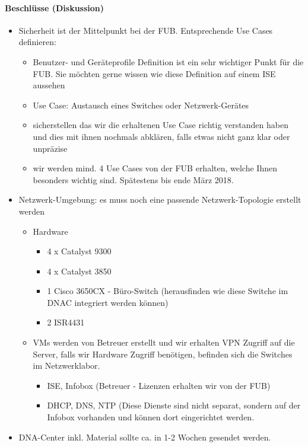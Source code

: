 \paragraph{Beschlüsse (Diskussion)}
\begin{itemize}	
	\item Sicherheit ist der Mittelpunkt bei der FUB. Entsprechende Use Cases definieren:
	\begin{itemize}
		\item Benutzer- und Geräteprofile Definition ist ein sehr wichtiger Punkt für die FUB. Sie möchten gerne wissen wie diese Definition auf einem ISE aussehen 
		\item Use Case: Austausch eines Switches oder Netzwerk-Gerätes
		\item sicherstellen das wir die erhaltenen Use Case richtig verstanden haben und dies mit ihnen nochmals abklären, falls etwas nicht ganz klar oder unpräzise
		\item wir werden mind. 4 Use Cases von der FUB erhalten, welche Ihnen besonders wichtig sind. Spätestens bis ende März 2018.			
	\end{itemize}
	\item Netzwerk-Umgebung: es muss noch eine passende Netzwerk-Topologie erstellt werden
	\begin{itemize}
		\item Hardware
		\begin{itemize}
			\item 4 x Catalyst 9300
			\item 4 x Catalyst 3850
			\item 1 Cisco 3650CX - Büro-Switch (herausfinden wie diese Switche im DNAC integriert werden können)
			\item 2 ISR4431
		\end{itemize}
		\item VMs werden von Betreuer erstellt und wir erhalten VPN Zugriff auf die Server, falls wir Hardware Zugriff benötigen, befinden sich die Switches im Netzwerklabor.
		\begin{itemize}
			\item ISE, Infobox (Betreuer - Lizenzen erhalten wir von der FUB)
			\item DHCP, DNS, NTP (Diese Dienste sind nicht separat, sondern auf der Infobox vorhanden und können dort eingerichtet werden.
		\end{itemize}
	\end{itemize}
	\item DNA-Center inkl. Material sollte ca. in 1-2 Wochen gesendet werden.

\end{itemize}
